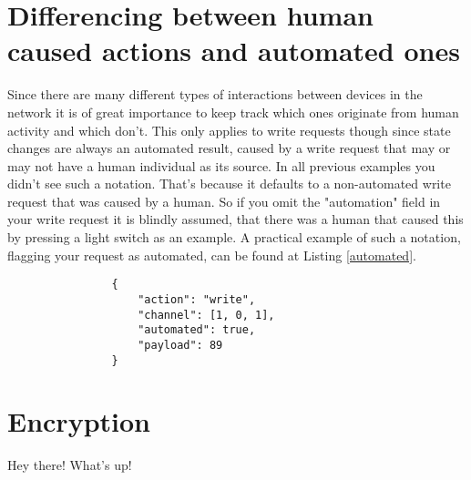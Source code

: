 \documentclass[11pt,a4paper, titlepage]{article}
\begin{document}
		\section[Automation]{Differencing between human caused actions and automated ones}
			Since there are many different types of interactions between devices in the network it is of great importance to keep track which ones originate from human activity and which don't. This only applies to write requests though since state changes are always an automated result, caused by a write request that may or may not have a human individual as its source. In all previous examples you didn't see such a notation. That's because it defaults to a non-automated write request that was caused by a human. So if you omit the "automation" field in your write request it is blindly assumed, that there was a human that caused this by pressing a light switch as an example. A practical example of such a notation, flagging your request as automated, can be found at Listing \ref{automated}.
			
			\begin{listing}
				\begin{verbatim}
				{
					"action": "write",
					"channel": [1, 0, 1],
					"automated": true,
					"payload": 89
				}
				\end{verbatim}
				\caption{Automated request}
				\label{automated}
			\end{listing}
		
		\section{Encryption}
			\label{sec:encryption}
			Hey there! What's up!
			\blindtext
		
		
\end{document}
